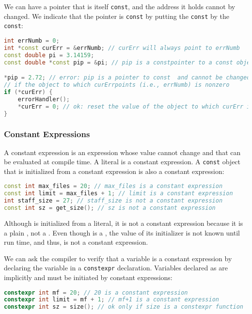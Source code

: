 We can have a pointer that is itself \texttt{const}, and the address it holds cannot by changed. We indicate that the pointer is \texttt{const} by putting the \texttt{const} by the \texttt{const}:
\begin{lstlisting}[language=C++]
int errNumb = 0; 
int *const curErr = &errNumb; // curErr will always point to errNumb 
const double pi = 3.14159; 
const double *const pip = &pi; // pip is a constpointer to a const object

*pip = 2.72; // error: pip is a pointer to const  and cannot be changed as the pointer is const
// if the object to which curErrpoints (i.e., errNumb) is nonzero 
if (*curErr) { 
    errorHandler(); 
    *curErr = 0; // ok: reset the value of the object to which curErr is bound because errNumb is not const 
}
\end{lstlisting}

\subsubsection*{Constant Expressions}

A constant expression is an expression whose value cannot change and that can be evaluated at compile time. A literal is a constant expression. A \texttt{const} object that is initialized from a constant expression is also a constant expression:
\begin{lstlisting}[language=C++]
const int max_files = 20; // max_files is a constant expression 
const int limit = max_files + 1; // limit is a constant expression 
int staff_size = 27; // staff_size is not a constant expression 
const int sz = get_size(); // sz is not a constant expression
\end{lstlisting}
Although  is initialized from a literal, it is not a constant expression because it is a plain , not a . Even though  is a , the value of its initializer is not known until run time, and thus,  is not a constant expression.

We can ask the compiler to verify that a variable is a constant expression by declaring the variable in a \texttt{constexpr} declaration. Variables declared as  are implicitly  and must be initiated by constant expressions:
\begin{lstlisting}[language=C++]
constexpr int mf = 20; // 20 is a constant expression 
constexpr int limit = mf + 1; // mf+1 is a constant expression 
constexpr int sz = size(); // ok only if size is a constexpr function
\end{lstlisting}

